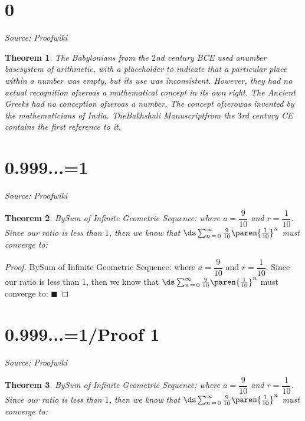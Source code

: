 \documentclass{article}
\newtheorem{theorem}{Theorem}
\begin{document}
\newpage

\section{0}
\textit{Source: Proofwiki}

\begin{theorem}
The Babylonians from the $2$nd century BCE used anumber basesystem of arithmetic, with a placeholder to indicate that a particular place within a number was empty, but its use was inconsistent.  However, they had no actual recognition ofzeroas a mathematical concept in its own right. The Ancient Greeks had no conception ofzeroas a number. The concept ofzerowas invented by the mathematicians of India. TheBakhshali Manuscriptfrom the $3$rd century CE contains the first reference to it.
\end{theorem}

\newpage

\section{0.999...=1}
\textit{Source: Proofwiki}

\begin{theorem}
BySum of Infinite Geometric Sequence: where $a = \dfrac 9 {10}$ and $r = \dfrac 1 {10}$. Since our ratio is less than $1$, then we know that $\ds \sum_{n \mathop = 0}^\infty \frac 9 {10} \paren {\frac 1 {10} }^n$ must converge to:
\end{theorem}

\begin{proof}
BySum of Infinite Geometric Sequence: where $a = \dfrac 9 {10}$ and $r = \dfrac 1 {10}$. Since our ratio is less than $1$, then we know that $\ds \sum_{n \mathop = 0}^\infty \frac 9 {10} \paren {\frac 1 {10} }^n$ must converge to: $\blacksquare$
\end{proof}

\newpage

\section{0.999...=1/Proof 1}
\textit{Source: Proofwiki}

\begin{theorem}
BySum of Infinite Geometric Sequence: where $a = \dfrac 9 {10}$ and $r = \dfrac 1 {10}$. Since our ratio is less than $1$, then we know that $\ds \sum_{n \mathop = 0}^\infty \frac 9 {10} \paren {\frac 1 {10} }^n$ must converge to:
\end{theorem}
\end{document}
